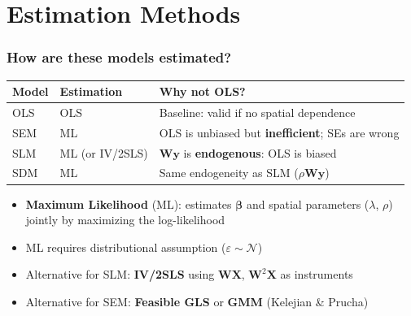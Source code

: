 \section{Estimation Methods}

\begin{frame}
\frametitle{How are these models estimated?}
\centering

\vspace{6pt}

{\footnotesize
\begin{tabular}{p{1.8cm}p{2.5cm}p{5.0cm}}
\hline
\textbf{Model} & \textbf{Estimation} & \textbf{Why not OLS?} \\
\hline
OLS        & OLS                & Baseline: valid if no spatial dependence \\[4pt]
SEM        & ML                 & OLS is unbiased but \textbf{inefficient}; SEs are wrong \\[4pt]
SLM        & ML (or IV/2SLS)    & $\mathbf{W}\mathbf{y}$ is \textbf{endogenous}: OLS is biased \\[4pt]
SDM        & ML                 & Same endogeneity as SLM ($\rho\mathbf{W}\mathbf{y}$) \\[4pt]
\hline
\end{tabular}
}

\vspace{10pt}

\begin{itemize}[<+->]
\item \textbf{Maximum Likelihood} (ML): estimates $\boldsymbol{\beta}$ and spatial parameters ($\lambda$, $\rho$) jointly by maximizing the log-likelihood
\item ML requires distributional assumption ($\varepsilon \sim \mathcal{N}$)
\vspace{6pt}
\item Alternative for SLM: \textbf{IV/2SLS} using $\mathbf{W}\mathbf{X}$, $\mathbf{W}^2\mathbf{X}$ as instruments
\item Alternative for SEM: \textbf{Feasible GLS} or \textbf{GMM} (Kelejian \& Prucha)
\end{itemize}

\end{frame}

